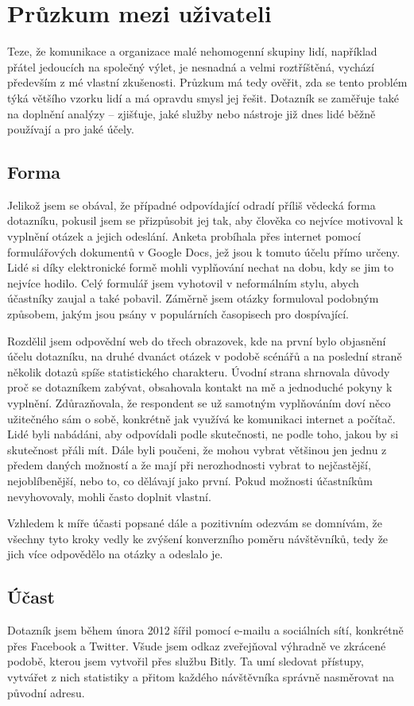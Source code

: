 \documentclass[12pt,oneside,final]{fithesis2}
\begin{document}
\section{Průzkum mezi uživateli}\label{poll}
Teze, že komunikace a organizace malé nehomogenní skupiny lidí, například přátel jedoucích na společný výlet, je nesnadná a velmi roztříštěná, vychází především z mé vlastní zkušenosti. Průzkum má tedy ověřit, zda se tento problém týká většího vzorku lidí a má opravdu smysl jej řešit. Dotazník se zaměřuje také na doplnění analýzy -- zjišťuje, jaké služby nebo nástroje již dnes lidé běžně používají a pro jaké účely.

\subsection{Forma}
Jelikož jsem se obával, že případné odpovídající odradí příliš vědecká forma dotazníku, pokusil jsem se přizpůsobit jej tak, aby člověka co nejvíce motivoval k vyplnění otázek a jejich odeslání. Anketa probíhala přes internet pomocí formulářových dokumentů v Google Docs, jež jsou k tomuto účelu přímo určeny. Lidé si díky elektronické formě mohli vyplňování nechat na dobu, kdy se jim to nejvíce hodilo. Celý formulář jsem vyhotovil v neformálním stylu, abych účastníky zaujal a také pobavil. Záměrně jsem otázky formuloval podobným způsobem, jakým jsou psány  v populárních časopisech pro dospívající.

Rozdělil jsem odpovědní web do třech obrazovek, kde na první bylo objasnění účelu dotazníku, na druhé dvanáct otázek v podobě scénářů a na poslední straně několik dotazů spíše statistického charakteru. Úvodní strana shrnovala důvody proč se dotazníkem zabývat, obsahovala kontakt na mě a jednoduché pokyny k vyplnění. Zdůrazňovala, že respondent se už samotným vyplňováním doví něco užitečného sám o sobě, konkrétně jak využívá ke komunikaci internet a počítač. Lidé byli nabádáni, aby odpovídali podle skutečnosti, ne podle toho, jakou by si skutečnost přáli mít. Dále byli poučeni, že mohou vybrat většinou jen jednu z předem daných možností a že mají při nerozhodnosti vybrat to nejčastější, nejoblíbenější, nebo to, co dělávají jako první. Pokud možnosti účastníkům nevyhovovaly, mohli často doplnit vlastní.

Vzhledem k míře účasti popsané dále a pozitivním odezvám se domnívám, že všechny tyto kroky vedly ke zvýšení konverzního poměru návštěvníků, tedy že jich více odpovědělo na otázky a odeslalo je.

\subsection{Účast}\label{attendance}
Dotazník jsem během února 2012 šířil pomocí e-mailu a sociálních sítí, konkrétně přes Facebook a Twitter. Všude jsem odkaz zveřejňoval výhradně ve zkrácené podobě, kterou jsem vytvořil přes službu Bitly. Ta umí sledovat přístupy, vytvářet z nich statistiky a přitom každého návštěvníka správně nasměrovat na původní adresu.
\end{document}
